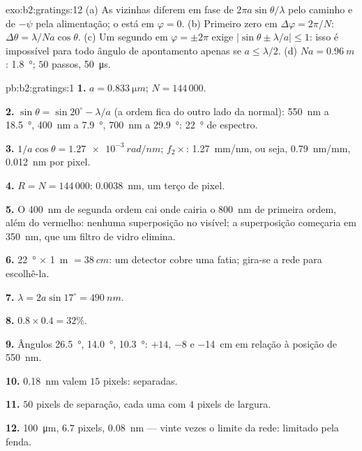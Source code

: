 \begin{solution}{exo:b2:gratings:12}
(a) As vizinhas diferem em fase de $2\pi a\sin\theta/\lambda$ pelo caminho e de $-\psi$
pela alimentação; o  está em $\varphi = 0$. (b) Primeiro zero em
$\Delta\varphi = 2\pi/N$: $\Delta\theta = \lambda/Na\cos\theta$. (c) Um segundo  em
$\varphi = \pm2\pi$ exige $|\sin\theta \pm \lambda/a| \le 1$: isso é impossível para todo ângulo de
apontamento apenas se $a \le \lambda/2$. (d) $Na = \qty{0.96}{m}$: \qty{1.8}{\degree}; $50$ passos,
\qty{50}{\micro s}.
\end{solution}

\begin{solution}{pb:b2:gratings:1}
\textbf{1.} $a = \qty{0.833}{\micro m}$; $N = 144\,000$.

\textbf{2.} $\sin\theta = \sin20^\circ - \lambda/a$ (a ordem fica do outro lado da
normal): \qty{550}{nm} a \qty{18.5}{\degree}, \qty{400}{nm} a \qty{7.9}{\degree}, \qty{700}{nm} a
\qty{29.9}{\degree}: \qty{22}{\degree} de espectro.

\textbf{3.} $1/a\cos\theta = \qty{1.27e-3}{rad/nm}$; $f_2\times$: \qty{1.27}{mm/nm}, ou seja,
\qty{0.79}{nm/mm}, \qty{0.012}{nm} por pixel.

\textbf{4.} $R = N = 144\,000$: \qty{0.0038}{nm}, um terço de pixel.

\textbf{5.} O \qty{400}{nm} de segunda ordem cai onde cairia o \qty{800}{nm} de
primeira ordem, além do vermelho: nenhuma superposição no visível; a superposição
começaria em \qty{350}{nm}, que um filtro de vidro elimina.

\textbf{6.} \qty{22}{\degree} $\times$ \qty{1}{m} $= \qty{38}{cm}$: um detector cobre uma fatia;
gira-se a rede para escolhê-la.

\textbf{7.} $\lambda = 2a\sin17^\circ = \qty{490}{nm}$.

\textbf{8.} $0.8 \times 0.4 = 32\%$.

\textbf{9.} Ângulos \qty{26.5}{\degree}, \qty{14.0}{\degree}, \qty{10.3}{\degree}: $+14$, $-8$ e
\qty{-14}{cm} em relação à posição de \qty{550}{nm}.

\textbf{10.} \qty{0.18}{nm} valem $15$ pixels: separadas.

\textbf{11.} $50$ pixels de separação, cada uma com $4$ pixels de largura.

\textbf{12.} \qty{100}{\micro m}, $6.7$ pixels, \qty{0.08}{nm} --- vinte vezes o
limite da rede: limitado pela fenda.


\end{solution}
